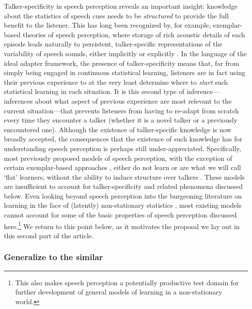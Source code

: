Talker-specificity in speech perception reveals an important insight: knowledge about the statistics of speech cues needs to be \emph{structured} to provide the full benefit to the listener.  This has long been recognized by, for example, exemplar-based theories of speech perception, where storage of rich acoustic details of each episode leads naturally to persistent, talker-specific representations of the variability of speech sounds, either implicitly or explicitly \autocite{Goldinger1996,Goldinger1998,Johnson1997,Johnson2006,Pierrehumbert2003}.  In the language of the ideal adapter framework, the presence of talker-specificity means that, far from simply being engaged in continuous statistical learning, listeners are in fact using their previous experience to at the very least determine where to \emph{start} such statistical learning in each situation. It is this second type of inference---inferences about what aspect of previous experience are most relevant to the current situation---that prevents listeners from having to re-adapt from scratch every time they encounter a talker (whether it is a novel talker or a previously encountered one). Although the existence of talker-specific knowledge is now broadly accepted, the consequences that the existence of such knowledge has for understanding speech perception is perhaps still under-appreciated. Specifically, most previously proposed models of speech perception, with the exception of certain exemplar-based approaches \autocite{Goldinger1998,Johnson1997,Pierrehumbert2003}, either do not learn \autocite{Clayards2008,Feldman2009a,Norris2008} or are what we will call `flat' learners, without the ability to induce structure over talkers \autocite{Feldman2013a,Lancia2013,McMurray2009,Mirman2006,Vallabha2007}. These models are insufficient to account for talker-specificity and related phenomena discussed below.  Even looking beyond speech perception into the burgeoning literature on learning in the face of (latently) non-stationary statistics \autocite[e.g.,][]{Cho2002,Gallistel2001}, most existing models cannot account for some of the basic properties of speech perception discussed here.\footnote{This also makes speech perception a potentially productive test domain for further development of general models of learning in a non-stationary world.} We return to this point below, as it motivates the proposal we lay out in this second part of the article.

\subsubsection{Generalize to the similar}
\label{sec:generalize-similar}


